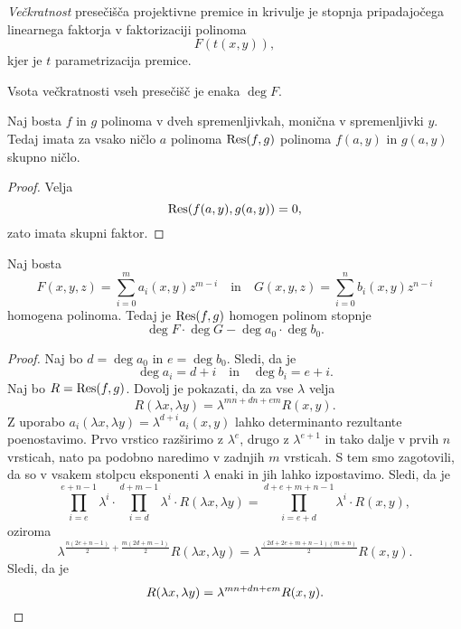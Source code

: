 
\begin{definicija}
\emph{Večkratnost} presečišča
projektivne premice in krivulje je stopnja pripadajočega linearnega
faktorja v faktorizaciji polinoma
\[
F(t(x,y)),
\]
kjer je $t$ parametrizacija premice.
\end{definicija}

\begin{opomba}
Vsota večkratnosti vseh presečišč je enaka $\deg F$.
\end{opomba}

\begin{trditev}
Naj bosta $f$ in $g$ polinoma v dveh spremenljivkah, monična v
spremenljivki $y$. Tedaj imata za vsako ničlo $a$ polinoma
$\operatorname{Res}(f,g)$ polinoma $f(a, y)$ in $g(a, y)$ skupno ničlo.
\end{trditev}

\begin{proof}
Velja
\[
\operatorname{Res}(f(a, y), g(a, y)) = 0,
\]
zato imata skupni faktor.
\end{proof}

\begin{trditev}
Naj bosta
\[
F(x, y, z) = \sum_{i=0}^m a_i(x,y) z^{m-i}
\quad \text{in} \quad
G(x, y, z) = \sum_{i=0}^n b_i(x,y) z^{n-i}
\]
homogena polinoma. Tedaj je $\operatorname{Res}(f,g)$ homogen polinom stopnje
\[
\deg F \cdot \deg G - \deg a_0 \cdot \deg b_0.
\]
\end{trditev}

\begin{proof}
Naj bo $d = \deg a_0$ in $e = \deg b_0$. Sledi, da je
\[
\deg a_i = d + i
\quad \text{in} \quad
\deg b_i = e + i.
\]
Naj bo $R = \operatorname{Res}(f, g)$. Dovolj je pokazati, da za vse $\lambda$
velja
\[
R(\lambda x, \lambda y) = \lambda^{mn + dn + em} R(x, y).
\]
Z uporabo $a_i(\lambda x, \lambda y) = \lambda^{d + i} a_i(x, y)$
lahko determinanto rezultante poenostavimo. Prvo vrstico razširimo
z $\lambda^e$, drugo z $\lambda^{e+1}$ in tako dalje v prvih $n$
vrsticah, nato pa podobno naredimo v zadnjih $m$ vrsticah. S tem
smo zagotovili, da so v vsakem stolpcu eksponenti $\lambda$ enaki
in jih lahko izpostavimo. Sledi, da je
\[
\prod_{i=e}^{e+n-1} \lambda^i \cdot
\prod_{i=d}^{d+m-1} \lambda^i \cdot
R(\lambda x, \lambda y) =
\prod_{i=e+d}^{d+e+m+n-1} \lambda^i \cdot R(x, y),
\]
oziroma
\[
\lambda^{\frac{n (2e + n - 1)}{2} + \frac{m(2d + m - 1)}{2}}
R(\lambda x, \lambda y) =
\lambda^{\frac{(2d + 2e + m + n - 1)(m + n)}{2}} R(x, y).
\]
Sledi, da je
\[
R(\lambda x, \lambda y) = \lambda^{mn + dn + em} R(x, y). \qedhere
\]
\end{proof}

